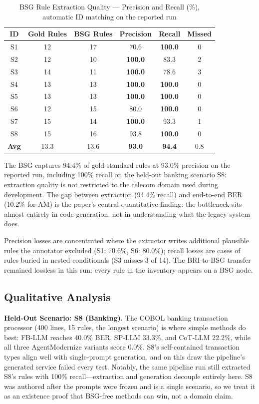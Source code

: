 \documentclass[conference]{IEEEtran}
\begin{document}
\begin{table}[htbp]
\caption{BSG Rule Extraction Quality --- Precision and Recall (\%), automatic ID matching on the reported run}
\label{tab:rq5}
\centering
\footnotesize
\begin{tabular}{@{}cccccc@{}}
\toprule
\textbf{ID} & \textbf{Gold Rules} & \textbf{BSG Rules} & \textbf{Precision} & \textbf{Recall} & \textbf{Missed} \\
\midrule
S1 & 12 & 17 & 70.6 & \textbf{100.0} & 0 \\
S2 & 12 & 10 & \textbf{100.0} & 83.3 & 2 \\
S3 & 14 & 11 & \textbf{100.0} & 78.6 & 3 \\
S4 & 13 & 13 & \textbf{100.0} & \textbf{100.0} & 0 \\
S5 & 13 & 13 & \textbf{100.0} & \textbf{100.0} & 0 \\
S6 & 12 & 15 & 80.0 & \textbf{100.0} & 0 \\
S7 & 15 & 14 & \textbf{100.0} & 93.3 & 1 \\
S8 & 15 & 16 & 93.8 & \textbf{100.0} & 0 \\
\midrule
\textbf{Avg} & 13.3 & 13.6 & \textbf{93.0} & \textbf{94.4} & 0.8 \\
\bottomrule
\end{tabular}
\end{table}

The BSG captures 94.4\% of gold-standard rules at 93.0\% precision on the reported run, including 100\% recall on the held-out banking scenario S8: extraction quality is not restricted to the telecom domain used during development. The gap between extraction (94.4\% recall) and end-to-end BER (10.2\% for AM) is the paper's central quantitative finding: the bottleneck sits almost entirely in code generation, not in understanding what the legacy system does.

Precision losses are concentrated where the extractor writes additional plausible rules the annotator excluded (S1: 70.6\%, S6: 80.0\%); recall losses are cases of rules buried in nested conditionals (S3 misses 3 of 14). The BRI-to-BSG transfer remained lossless in this run: every rule in the inventory appears on a BSG node.

\subsection{Qualitative Analysis}

\textbf{Held-Out Scenario: S8 (Banking).} The COBOL banking transaction processor (400 lines, 15 rules, the longest scenario) is where simple methods do best: FB-LLM reaches 40.0\% BER, SP-LLM 33.3\%, and CoT-LLM 22.2\%, while all three AgentModernize variants score 0.0\%. S8's self-contained transaction types align well with single-prompt generation, and on this draw the pipeline's generated service failed every test. Notably, the same pipeline run still extracted S8's rules with 100\% recall---extraction and generation decouple entirely here. S8 was authored after the prompts were frozen and is a single scenario, so we treat it as an existence proof that BSG-free methods can win, not a domain claim.
\end{document}
